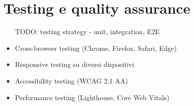 \section{Testing e quality assurance}
\begin{itemize}
  \item [TODO: testing strategy - unit, integration, E2E]
  \item Cross-browser testing (Chrome, Firefox, Safari, Edge)
  \item Responsive testing su diversi dispositivi
  \item Accessibility testing (WCAG 2.1 AA)
  \item Performance testing (Lighthouse, Core Web Vitals)
\end{itemize}